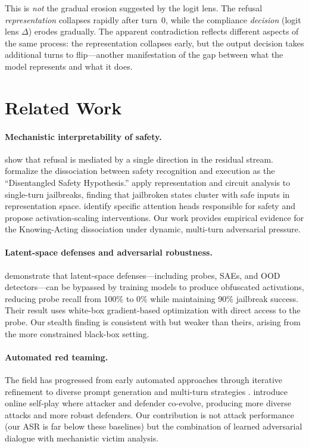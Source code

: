 \documentclass[11pt]{article}
\begin{document}
This is \emph{not} the gradual erosion suggested by the logit lens.
The refusal \emph{representation} collapses rapidly after turn~0, while the compliance \emph{decision} (logit lens $\Delta$) erodes gradually.
The apparent contradiction reflects different aspects of the same process: the representation collapses early, but the output decision takes additional turns to flip---another manifestation of the gap between what the model represents and what it does.

\section{Related Work}
\label{sec:related}

\paragraph{Mechanistic interpretability of safety.}
\citet{arditi2024refusal} show that refusal is mediated by a single direction in the residual stream.
\citet{wu2026knowingwithoutacting} formalize the dissociation between safety recognition and execution as the ``Disentangled Safety Hypothesis.''
\citet{jailbreaklens2024} apply representation and circuit analysis to single-turn jailbreaks, finding that jailbroken states cluster with safe inputs in representation space.
\citet{park2026asguard} identify specific attention heads responsible for safety and propose activation-scaling interventions.
Our work provides empirical evidence for the Knowing-Acting dissociation under dynamic, multi-turn adversarial pressure.

\paragraph{Latent-space defenses and adversarial robustness.}
\citet{bailey2024obfuscated} demonstrate that latent-space defenses---including probes, SAEs, and OOD detectors---can be bypassed by training models to produce obfuscated activations, reducing probe recall from 100\% to 0\% while maintaining 90\% jailbreak success.
Their result uses white-box gradient-based optimization with direct access to the probe.
Our stealth finding is consistent with but weaker than theirs, arising from the more constrained black-box setting.

\paragraph{Automated red teaming.}
The field has progressed from early automated approaches \citep{perez2022redteaming} through iterative refinement \citep{chao2023pair} to diverse prompt generation \citep{samvelyan2024rainbow} and multi-turn strategies \citep{russinovich2025crescendo, pavlova2024goat}.
\citet{liu2025selfredteam} introduce online self-play where attacker and defender co-evolve, producing more diverse attacks and more robust defenders.
Our contribution is not attack performance (our ASR is far below these baselines) but the combination of learned adversarial dialogue with mechanistic victim analysis.
\end{document}
